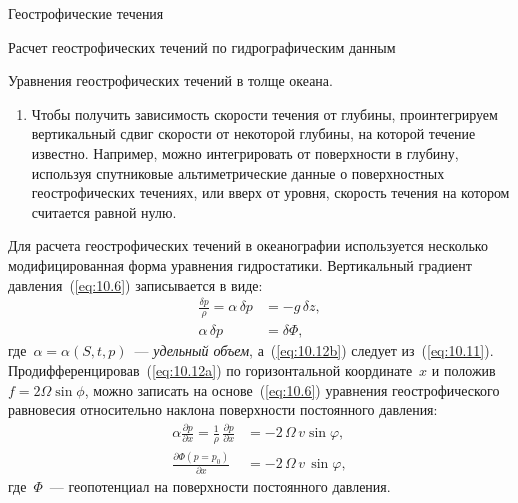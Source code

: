 \begin{chapter}{Геострофические течения}
\begin{section}{Расчет геострофических течений по гидрографическим данным}
\begin{paragraph}{Уравнения геострофических течений в толще океана.}
\begin{enumerate}
\item
Чтобы получить зависимость скорости течения от глубины, проинтегрируем 
вертикальный сдвиг скорости от некоторой глубины, на которой течение известно. 
Например, можно интегрировать от поверхности в глубину, используя спутниковые
альтиметрические данные о поверхностных геострофических течениях, или
вверх от уровня, скорость течения на котором считается равной нулю.
%
\end{enumerate}
Для расчета геострофических течений в океанографии используется
несколько модифицированная форма уравнения гидростатики. Вертикальный
градиент давления~(\ref{eq:10.6}) записывается в виде:
\begin{subequations}
\begin{align}
 \frac{\delta p}{\rho}=\alpha\,\delta p &=-g\,\delta z, \label{eq:10.12a}\\
 \alpha\,\delta p&=\delta\Phi, \label{eq:10.12b}
\end{align}
\end{subequations}
где~$\alpha = \alpha(S,t,p)$~--- \emph{удельный объем}, 
а~(\ref{eq:10.12b}) следует из~(\ref{eq:10.11}). 
Продифференцировав~(\ref{eq:10.12a}) по горизонтальной координате~$x$
и положив~$f = 2 \Omega\sin \phi $, можно записать на основе~(\ref{eq:10.6}) 
уравнения геострофического равновесия относительно наклона поверхности 
постоянного давления:
\begin{subequations}
 \begin{align}
  \alpha\frac{\partial p}{\partial x} 
    =\frac{1}{\rho}\,\frac{\partial p}{\partial x} 
  & =-2\,\Omega \,v\sin \varphi, \\
  \frac{\partial \Phi \left( p=p_0 \right)} {\partial x}
  & =-2\,\Omega \,v \, \sin{\varphi},\label{eq:10.13b}
\end{align}
\end{subequations}
где~$\Phi$~--- геопотенциал на поверхности постоянного давления.
%

\end{paragraph}
\end{section}
\end{chapter}
